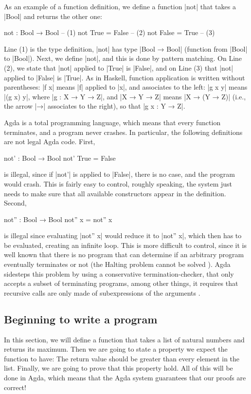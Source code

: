 As an example of a function definition, we define a function |not| that takes a |Bool| and returns the other one:
\begin{code}
not : Bool → Bool  -- (1)
not True = False   -- (2)
not False = True   -- (3)
\end{code}
Line (1) is the type definition, |not| has type |Bool → Bool| (function from |Bool| to |Bool|). Next, we define |not|, and this is done by pattern matching. On Line (2), we state that |not| applied to |True| is |False|, and on Line (3) that |not| applied to |False| is |True|. As in Haskell, function application is written without parentheses: |f x| means |f| applied to |x|, and associates to the left: |g x y| means |(g x) y|, where |g : X → Y → Z|, and |X → Y → Z| means |X → (Y → Z)| (i.e., the arrow |→| associates to the right), so that |g x : Y → Z|.

Agda is a total programming language, which means that every function terminates, and a program never crashes. In particular, the following definitions are not legal Agda code. First,
\begin{code}
not' : Bool → Bool
not' True = False
\end{code}
is illegal, since if |not'| is applied to |False|, there is no case, and the program would crash. This is fairly easy to control, roughly speaking, the system just needs to make sure that all available constructors appear in the definition. Second,
\begin{code}
not'' : Bool → Bool
not'' x = not'' x
\end{code}
is illegal since evaluating |not'' x| would reduce it to |not'' x|, which then has to be evaluated, creating an infinite loop. This is more difficult to control, since it is well known that there is no program that can determine if an arbitrary program eventually terminates or not (the Halting problem cannot be solved \cite{Turing}). Agda sidesteps this problem by using a conservative termination-checker, that only accepts a subset of terminating programs, among other things, it requires that recursive calls are only made of subexpressions of the arguments \cite{Agda-reference-manual-totality}. 

\subsection{Beginning to write a program}
In this section, we will define a function that takes a list of natural numbers and returns its maximum. Then we are going to state a property we expect the function to have:  The return value should be greater than every element in the list.
Finally, we are going to prove that this property hold. All of this will be done in Agda, which means that the Agda system guarantees that our proofs are correct!

